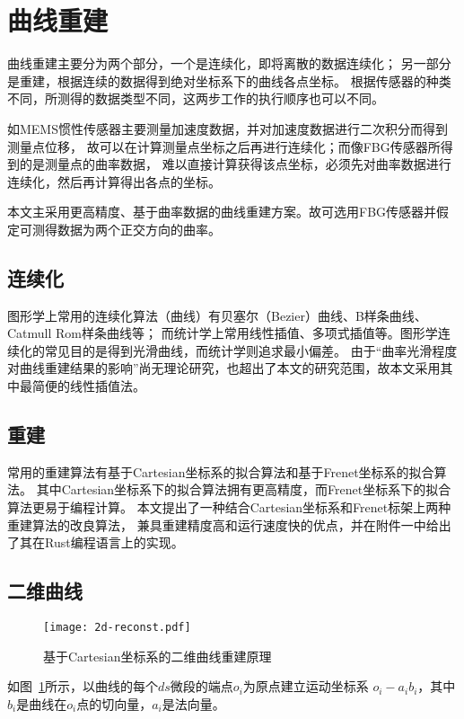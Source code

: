 \cleardoublepage

\section{曲线重建}

曲线重建主要分为两个部分，一个是连续化，即将离散的数据连续化；
另一部分是重建，根据连续的数据得到绝对坐标系下的曲线各点坐标。
根据传感器的种类不同，所测得的数据类型不同，这两步工作的执行顺序也可以不同。

如MEMS惯性传感器主要测量加速度数据，并对加速度数据进行二次积分而得到测量点位移，
故可以在计算测量点坐标之后再进行连续化；而像FBG传感器所得到的是测量点的曲率数据，
难以直接计算获得该点坐标，必须先对曲率数据进行连续化，然后再计算得出各点的坐标。

本文主采用更高精度、基于曲率数据的曲线重建方案。故可选用FBG传感器并假定可测得数据为两个正交方向的曲率。

\subsection{连续化}
图形学上常用的连续化算法（曲线）有贝塞尔（Bezier）曲线、B样条曲线、Catmull Rom样条曲线等；
而统计学上常用线性插值、多项式插值等。图形学连续化的常见目的是得到光滑曲线，而统计学则追求最小偏差。
由于“曲率光滑程度对曲线重建结果的影响”尚无理论研究，也超出了本文的研究范围，故本文采用其中最简便的线性插值法。

\subsection{重建}
常用的重建算法有基于Cartesian坐标系的拟合算法和基于Frenet坐标系的拟合算法。
其中Cartesian坐标系下的拟合算法拥有更高精度，而Frenet坐标系下的拟合算法更易于编程计算。
本文提出了一种结合Cartesian坐标系和Frenet标架上两种重建算法的改良算法，
兼具重建精度高和运行速度快的优点，并在附件一中给出了其在Rust编程语言上的实现。

\subsection{二维曲线}

\begin{figure}
\centering
\texttt{[image: 2d-reconst.pdf]}
\caption{基于Cartesian坐标系的二维曲线重建原理}
\label{fig:2d-reconst} 
\end{figure}

如图~\ref{fig:2d-reconst}所示，以曲线的每个$ds$微段的端点$o_i$为原点建立运动坐标系 $o_i-a_ib_i$，其中$b_i$是曲线在$o_i$点的切向量，$a_i$是法向量。

